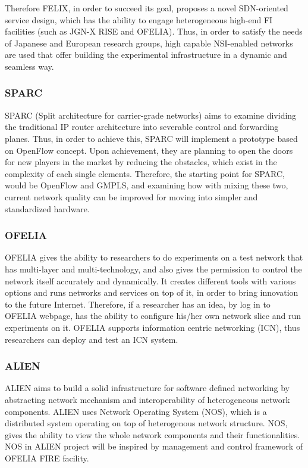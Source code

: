 Therefore FELIX, in order to succeed its goal, proposes a novel SDN-oriented service design, which has the ability to engage heterogeneous high-end FI facilities (such as JGN-X RISE and OFELIA). Thus, in order to satisfy the needs of Japanese and European research groups, high capable NSI-enabled networks are used that offer building the experimental infrastructure in a dynamic and seamless way. 

\subsubsection{SPARC}

SPARC (Split architecture for carrier-grade networks) aims to examine dividing the traditional IP router architecture into severable control and forwarding planes. Thus, in order to achieve this, SPARC will implement a prototype based on OpenFlow concept. Upon achievement, they are planning to open the doors for new players in the market by reducing the obstacles, which exist in the complexity of each single elements. Therefore, the starting point for SPARC, would be OpenFlow and GMPLS, and examining how with mixing these two, current network quality can be improved for moving into simpler and standardized hardware. \cite{SPARCproject}

\subsubsection{OFELIA}

OFELIA gives the ability to researchers to do experiments on a test network that has multi-layer and multi-technology, and also gives the permission to control the network itself accurately and dynamically. It creates different tools with various options and runs networks and services on top of it, in order to bring innovation to the future Internet. Therefore, if a researcher has an idea, by log in to OFELIA webpage, has the ability to configure his/her own network slice and run experiments on it. OFELIA supports information centric networking (ICN), thus researchers can deploy and test an ICN system. \cite{OFELIAproject}   

\subsubsection{ALIEN}

ALIEN aims to build a solid infrastructure for software defined networking by abstracting network mechanism and interoperability of heterogeneous network components. ALIEN uses Network Operating System (NOS), which is a distributed system operating on top of heterogenous network structure. NOS, gives the ability to view the whole network components and their functionalities. NOS in ALIEN project will be inspired by management and control framework of OFELIA FIRE facility. \cite{ALIENproject}

